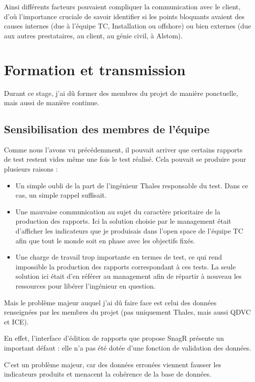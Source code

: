 Ainsi différents facteurs pouvaient compliquer la communication avec le client, d'où l'importance cruciale de savoir identifier si les points bloquants avaient des causes internes (due à l'équipe \gls{TC}, Installation ou offshore) ou bien externes (due aux autres prestataires, au client, au génie civil, à Alstom).


\newpage
\section{Formation et transmission}

Durant ce stage, j'ai dû former des membres du projet de manière ponctuelle, mais aussi de manière continue.
\subsection{Sensibilisation des membres de l'équipe }


Comme nous l'avons vu précédemment, il pouvait arriver que certains rapports de test restent vides même une fois le test réalisé. Cela pouvait se produire pour plusieurs raisons :
\begin{itemize}
\item Un simple oubli de la part de l'ingénieur Thales responsable du test. Dans ce cas, un simple rappel suffisait.
\item Une mauvaise communication au sujet du caractère prioritaire de la production des rapports. Ici la solution choisie par le management était d'afficher les indicateurs que je produisais dans l'open space de l'équipe \gls{TC} afin que tout le monde soit en phase avec les objectifs fixés.
\item Une charge de travail trop importante en termes de test, ce qui rend impossible la production des rapports correspondant à ces tests. La seule solution ici était d'en référer au management afin de répartir à nouveau les ressources pour libérer l'ingénieur en question.
\end{itemize}

Mais le problème majeur auquel j'ai dû faire face est celui des données renseignées par les membres du projet (pas uniquement Thales, mais aussi QDVC et ICE).

En effet, l'interface d'édition de rapports que propose \gls{SnagR} présente un important défaut : elle n'a pas été dotée d'une fonction de validation des données.

C'est un problème majeur, car des données erronées viennent fausser les indicateurs produits et menacent la cohérence de la base de données.

